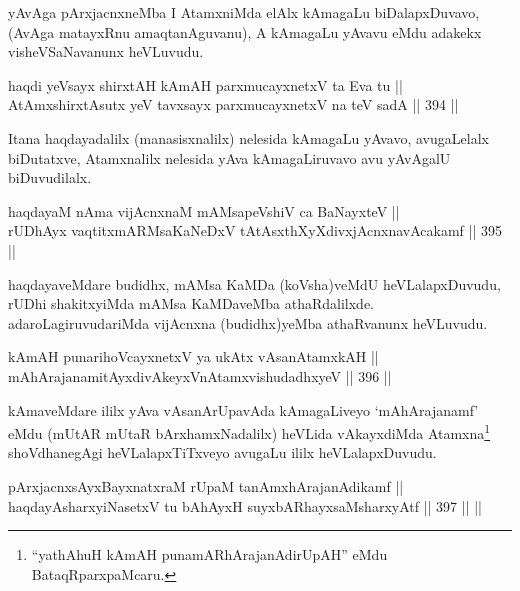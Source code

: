 \begin{artha}
yAvAga pArxjacnxneMba I AtamxniMda elAlx kAmagaLu biDalapxDuvavo,
(AvAga matayxRnu amaqtanAguvanu), A kAmagaLu yAvavu eMdu adakekx
visheVSaNavanunx heVLuvudu.
\end{artha}


\begin{shl}
haqdi yeV\s sayx shirxtAH kAmAH parxmucayxnetxV ta Eva tu || \\
AtAmxshirxtAsutx yeV tavxsayx parxmucayxnetxV na teV sadA \hfill || 394 ||  
\end{shl}

\begin{artha}
Itana haqdayadalilx (manasisxnalilx) nelesida kAmagaLu yAvavo, avugaLelalx
biDutatxve, Atamxnalilx nelesida yAva kAmagaLiruvavo avu yAvAgalU
biDuvudilalx.
\end{artha}

\begin{shl}
haqdayaM nAma vijAcnxnaM mAMsapeVshiV ca BaNayxteV || \\
rUDhAyx vaqtitxmARMsaKaNeDxV tAtAsxthXyXdivxjAcnxnavAcakamf \hfill || 395 ||  
\end{shl}

\begin{artha}
haqdayaveMdare budidhx, mAMsa KaMDa (koVsha)veMdU heVLalapxDuvudu,
rUDhi shakitxyiMda mAMsa KaMDaveMba
athaRdalilxde. adaroLagiruvudariMda vijAcnxna (budidhx)yeMba
athaRvanunx heVLuvudu.
\end{artha}


\begin{shl}
kAmAH punarihoVcayxnetxV ya ukAtx vAsanAtamxkAH || \\
mAhArajanamitAyxdivAkeyxVnA\s \s tamxvishudadhxyeV \hfill || 396 ||  
\end{shl}

\begin{artha}
kAmaveMdare ililx yAva vAsanArUpavAda kAmagaLiveyo `mAhArajanamf' eMdu (mUtAR mUtaR bArxhamxNadalilx) heVLida vAkayxdiMda Atamxna\footnote{``yathAhuH kAmAH punamARhArajanAdirUpAH'' eMdu BataqRparxpaMcaru.} shoVdhanegAgi heVLalapxTiTxveyo avugaLu ililx heVLalapxDuvudu.
\end{artha}


\begin{shl}
pArxjacnxsAyxBayxnatxraM rUpaM tanAmxhArajanAdikamf || \\
haqdayAsharxyiNasetxV tu bAhAyxH suyxbARhayxsaMsharxyAtf \hfill || 397 ||  ||  
\end{shl}

